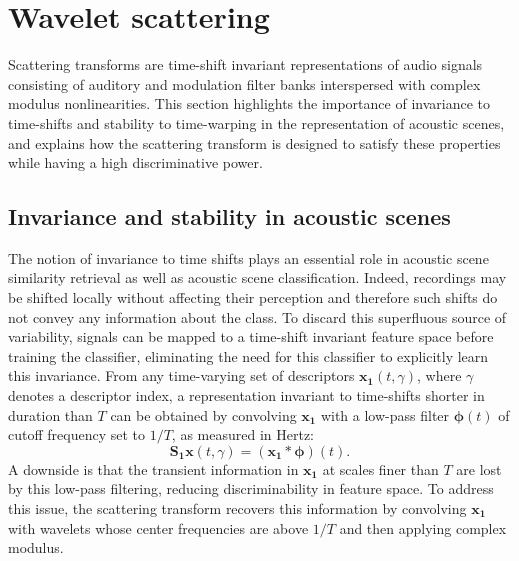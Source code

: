 \documentclass[journal]{IEEEtran}
\newcommand{\ja}[1]{\textcolor{magenta}{Joakim : #1}}
\begin{document}


\section{Wavelet scattering \label{sec:scattering}}

Scattering transforms are time-shift invariant representations of audio signals consisting of auditory and modulation filter banks interspersed with complex modulus nonlinearities.
This section highlights the importance of invariance to time-shifts and stability to time-warping in the representation of acoustic scenes, and explains how the scattering transform is designed to satisfy these properties while having a high discriminative power.

\subsection{Invariance and stability in acoustic scenes}
The notion of invariance to time shifts plays an essential role in acoustic scene similarity retrieval as well as acoustic scene classification.
Indeed, recordings may be shifted locally without affecting their perception and therefore such shifts do not convey any information about the class.
To discard this superfluous source of variability, signals can be mapped to a time-shift invariant feature space before training the classifier, eliminating the need for this classifier to explicitly learn this invariance.
From any time-varying set of descriptors $\boldsymbol{x_1}(t,\gamma)$, where $\gamma$ denotes a descriptor index, a representation invariant to time-shifts shorter in duration than $T$ can be obtained by convolving $\boldsymbol{x_1}$ with a low-pass filter $\boldsymbol{\phi}(t)$ of cutoff frequency set to $1/T$, as measured in Hertz:
\begin{equation}
\mathbf{S_1}\boldsymbol{x}(t, \gamma) = (\boldsymbol{x_1} \ast \boldsymbol{\phi}) (t).
\end{equation}
A downside is that the transient information in $\boldsymbol{x_1}$ at scales finer than $T$ are lost by this low-pass filtering, reducing discriminability in feature space.
To address this issue, the scattering transform recovers this information by convolving $\boldsymbol{x_1}$ with wavelets whose center frequencies are above $1/T$ and then applying complex modulus.
\end{document}
